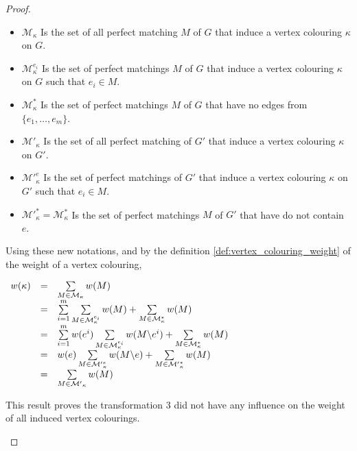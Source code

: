 \begin{proof}
\begin{enumerate}
            \begin{itemize}
                \item $\mathcal{M}_\kappa$ Is the set of all perfect matching $M$ of $G$ that induce a vertex colouring $\kappa$ on $G$.
                \item $\mathcal{M}_\kappa^{e_i}$ Is the set of perfect matchings $M$ of $G$ that induce a vertex colouring $\kappa$ on $G$ such that $e_i \in M$.
                \item $\mathcal{M}_\kappa^{*}$ Is the set of perfect matchings $M$ of $G$ that have no edges from $\{e_1, \dots, e_m\}$.
                \item $\mathcal{M'}_\kappa$ Is the set of all perfect matching of $G'$ that induce a vertex colouring $\kappa$ on $G'$.
                \item $\mathcal{M'}_\kappa^{e}$ Is the set of perfect matchings of $G'$ that induce a vertex colouring $\kappa$ on $G'$ such that $e_i \in M$.
                \item $\mathcal{M'}_\kappa^{*} = \mathcal{M}_\kappa^{*}$ Is the set of perfect matchings $M$ of $G'$ that have do not contain $e$.
            \end{itemize}

            Using these new notations, and by the definition \ref{def:vertex_colouring_weight} of the weight of a vertex colouring, 

            \begin{center}
                $\begin{array}{r c l}
                    w(\kappa) & = & \sum\limits_{M \in \mathcal{M}_\kappa} w(M)  \\
                              & = & \sum\limits_{i = 1}^m \sum\limits_{M \in \mathcal{M}_\kappa^{e_i}} w(M) + \sum\limits_{M \in \mathcal{M}_\kappa^{*}} w(M) \\
                              & = & \sum\limits_{i = 1}^m w(e^i) \sum\limits_{M \in \mathcal{M}_\kappa^{e_i}} w(M \backslash e^i) + \sum\limits_{M \in \mathcal{M}_\kappa^{*}} w(M) \\
                              & = & w(e) \sum\limits_{M \in \mathcal{M'}_\kappa^{e}} w(M \backslash e) + \sum\limits_{M \in \mathcal{M'}_\kappa^{*}} w(M) \\
                              & = & \sum\limits_{M \in \mathcal{M'}_\kappa} w(M)
                \end{array}$
            \end{center}

            This result proves the transformation 3 did not have any influence on the weight of all induced vertex colourings.
    \end{enumerate}
\end{proof}

